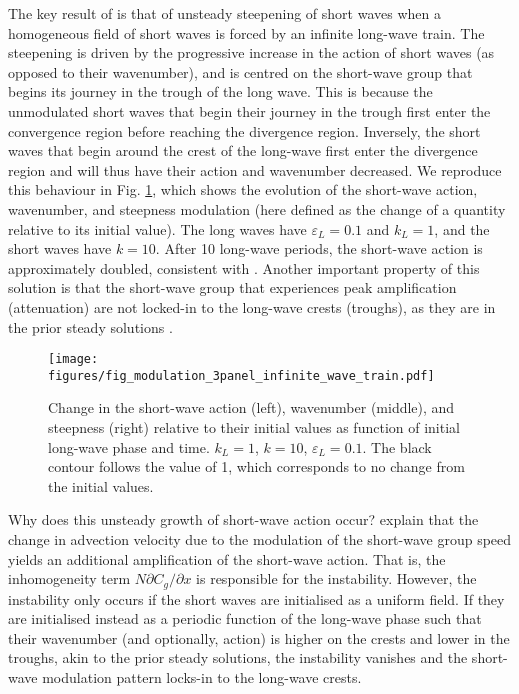 \documentclass[lineno]{jfm}
\begin{document}
The key result of \citet{peureux2021unsteady} is that of unsteady steepening of
short waves when a homogeneous field of short waves is forced by an infinite
long-wave train.
The steepening is driven by the progressive increase in the action of short
waves (as opposed to their wavenumber), and is centred on the short-wave group
that begins its journey in the trough of the long wave.
This is because the unmodulated short waves that begin their journey in the
trough first enter the convergence region before reaching the divergence region.
Inversely, the short waves that begin around the crest of the long-wave first
enter the divergence region and will thus have their action and wavenumber
decreased.
We reproduce this behaviour in Fig. \ref{fig:modulation_3panel_infinite}, which
shows the evolution of the short-wave action, wavenumber, and steepness
modulation (here defined as the change of a quantity relative to its initial value).
The long waves have $\varepsilon_L = 0.1$ and $k_L = 1$, and the short waves
have $k = 10$.
After 10 long-wave periods, the short-wave action is approximately doubled,
consistent with \citet{peureux2021unsteady}.
Another important property of this solution is that the short-wave group that
experiences peak amplification (attenuation) are not locked-in to the long-wave
crests (troughs), as they are in the prior steady solutions
\citep{longuet1960changes,longuet1987propagation,zhang1990evolution}.

\begin{figure}
\centering
\texttt{[image: figures/fig\_modulation\_3panel\_infinite\_wave\_train.pdf]}
\caption{
  Change in the short-wave action (left), wavenumber (middle), and steepness (right)
  relative to their initial values as function of initial long-wave phase and time.
  $k_L = 1$, $k = 10$, $\varepsilon_L = 0.1$.
  The black contour follows the value of 1, which corresponds to no change
  from the initial values.
}
\label{fig:modulation_3panel_infinite}
\end{figure}

Why does this unsteady growth of short-wave action occur?
\citet{peureux2021unsteady} explain that the change in advection velocity due to
the modulation of the short-wave group speed yields an additional amplification
of the short-wave action.
That is, the inhomogeneity term $N \partial C_g / \partial x$ is
responsible for the instability.
However, the instability only occurs if the short waves are initialised as a
uniform field.
If they are initialised instead as a periodic function of the long-wave phase
such that their wavenumber (and optionally, action) is higher on the crests
and lower in the troughs, akin to the prior steady solutions, the instability
vanishes and the short-wave modulation pattern locks-in to the long-wave
crests.
\end{document}
